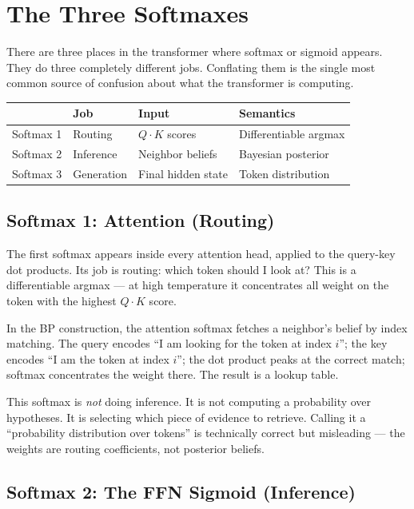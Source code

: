 \section{The Three Softmaxes}
\label{sec:three-softmaxes}

There are three places in the transformer where softmax or sigmoid appears. They do
three completely different jobs. Conflating them is the single most common source of
confusion about what the transformer is computing.

\begin{center}
\begin{tabular}{llll}
\toprule
& Job & Input & Semantics \\
\midrule
Softmax 1 & Routing & $Q \cdot K$ scores & Differentiable argmax \\
Softmax 2 & Inference & Neighbor beliefs & Bayesian posterior \\
Softmax 3 & Generation & Final hidden state & Token distribution \\
\bottomrule
\end{tabular}
\end{center}

\subsection*{Softmax 1: Attention (Routing)}

The first softmax appears inside every attention head, applied to the query-key dot
products. Its job is routing: which token should I look at? This is a differentiable
argmax --- at high temperature it concentrates all weight on the token with the
highest $Q \cdot K$ score.

In the BP construction, the attention softmax fetches a neighbor's belief by index
matching. The query encodes ``I am looking for the token at index $i$''; the key
encodes ``I am the token at index $i$''; the dot product peaks at the correct match;
softmax concentrates the weight there. The result is a lookup table.

This softmax is \emph{not} doing inference. It is not computing a probability over
hypotheses. It is selecting which piece of evidence to retrieve. Calling it a
``probability distribution over tokens'' is technically correct but misleading ---
the weights are routing coefficients, not posterior beliefs.

\subsection*{Softmax 2: The FFN Sigmoid (Inference)}

